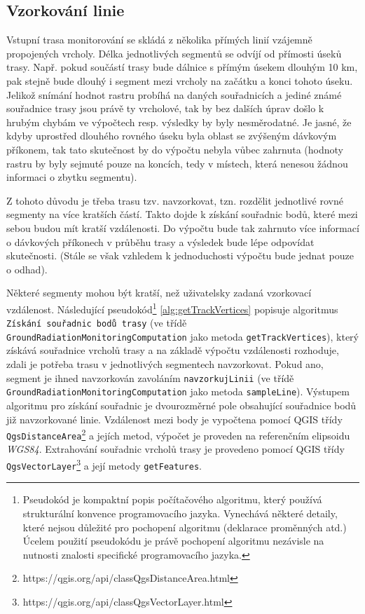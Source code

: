 \subsection{Vzorkování linie}
\label{subsec:vzorkovaniLinie}
Vstupní trasa monitorování se skládá z několika přímých linií vzájemně propojených vrcholy. Délka jednotlivých segmentů se odvíjí od přímosti úseků trasy. Např. pokud součástí trasy bude dálnice s přímým úsekem dlouhým 10 km, pak stejně bude dlouhý i segment mezi vrcholy na začátku a konci tohoto úseku. Jelikož snímání hodnot rastru probíhá na daných souřadnicích a jediné známé souřadnice trasy jsou právě ty vrcholové, tak by bez dalších úprav došlo k hrubým chybám ve výpočtech resp. výsledky by byly nesměrodatné. Je jasné, že kdyby uprostřed dlouhého rovného úseku byla oblast se zvýšeným dávkovým příkonem, tak tato skutečnost by do výpočtu nebyla vůbec zahrnuta (hodnoty rastru by byly sejmuté pouze na koncích, tedy v místech, která nenesou žádnou informaci o zbytku segmentu). 

Z tohoto důvodu je třeba trasu tzv. navzorkovat, tzn. rozdělit jednotlivé rovné segmenty na více kratších částí. Takto dojde k získání souřadnic bodů, které mezi sebou budou mít kratší vzdálenosti. Do výpočtu bude tak zahrnuto více informací o dávkových příkonech v průběhu trasy a výsledek bude lépe odpovídat skutečnosti. (Stále se však vzhledem k jednoduchosti výpočtu bude jednat pouze o odhad). 

Některé segmenty mohou být kratší, než uživatelsky zadaná vzorkovací vzdálenost. Následující pseudokód\footnote{Pseudokód je kompaktní popis počítačového algoritmu, který používá strukturální konvence programovacího jazyka. Vynechává některé detaily, které nejsou důležité pro pochopení algoritmu (deklarace proměnných atd.) Úcelem použití pseudokódu je právě pochopení algoritmu nezávisle na nutnosti znalosti specifické programovacího jazyka.\cite{pseudocode}} 
\ref{alg:getTrackVertices} popisuje algoritmus \texttt{Získání souřadnic bodů trasy} (ve třídě \texttt{GroundRadiationMonitoringComputation} jako metoda \texttt{getTrackVertices}), který získává souřadnice vrcholů trasy a na základě výpočtu vzdálenosti rozhoduje, zdali je potřeba trasu v jednotlivých segmentech navzorkovat. Pokud ano, segment je ihned navzorkován zavoláním \texttt{navzorkujLinii} (ve třídě \texttt{GroundRadiationMonitoringComputation} jako metoda \texttt{sampleLine}). Výstupem algoritmu pro získání souřadnic je dvourozměrné pole obsahující souřadnice bodů již navzorkované linie. Vzdálenost mezi body je vypočtena pomocí QGIS třídy \texttt{QgsDistanceArea}\footnote{https://qgis.org/api/classQgsDistanceArea.html} a jejích metod, výpočet je proveden na referenčním elipsoidu \textit{WGS84}. Extrahování souřadnic vrcholů trasy je provedeno pomocí QGIS třídy \texttt{QgsVectorLayer}\footnote{https://qgis.org/api/classQgsVectorLayer.html} a její metody \texttt{getFeatures}.

